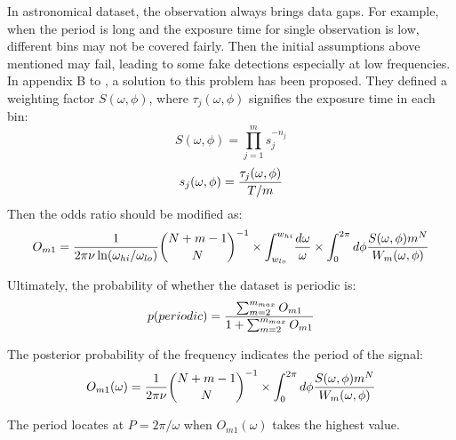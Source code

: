 \documentclass[twoside,twocolumn]{aastex63}
\begin{document}
In astronomical dataset, the observation always brings data gaps. For example, when the period is long and the exposure time for single observation is low, different bins may not be covered fairly. Then the initial assumptions above mentioned may fail, leading to some fake detections especially at low frequencies. In appendix B to \citep{1992ApJ...398..146G}, a solution to this problem has been proposed. They defined a weighting factor $S(\omega,\phi)$, where ${\tau_{j}(\omega,\phi)}$ signifies the exposure time in each bin:
\begin{equation}\label{A17}
S(\omega,\phi)={\prod_{j=1}^m s_j^{-n_j}}
\end{equation}
\begin{equation}
s_j(\omega,\phi)={{\tau_{j}(\omega,\phi)}\over {T/m}}
\end{equation}
\indent
Then the odds ratio should be modified as:
\begin{equation}\label{A19}
O_{m1}={1\over{2\pi \nu \ln(\omega_{hi}/\omega_{lo})}} {{N+m-1}	\choose N}^{-1}\times {\int_{w_{lo}}^{w_{hi}}}{{d\omega}\over{\omega}}\times {\int_0^{2\pi}d\phi{S(\omega,\phi)m^N\over W_m(\omega,\phi)}} 
\end{equation}

Ultimately, the probability of whether the dataset is periodic is:
\begin{equation}\label{A20}
p(periodic)={{\sum_{m=2}^{m_{max}} O_{m1}}\over {1+\sum_{m=2}^{m_{max}} O_{m1}}}
\end{equation}

The posterior probability of the frequency indicates the period of the signal:
\begin{equation}\label{A21}
O_{m1}(\omega)={1\over{2\pi \nu}} {{N+m-1}	\choose N}^{-1} \times {\int_0^{2\pi}d\phi{S(\omega,\phi)m^N\over W_m(\omega,\phi)}} 
\end{equation}

The period locates at $P=2\pi /\omega $ when $O_{m1}(\omega)$ takes the highest value.
\end{document}
